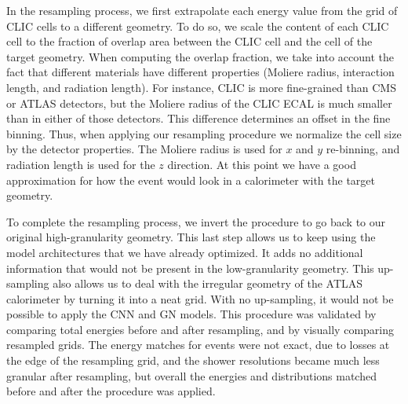 In the resampling process, we first extrapolate each energy value from the grid of CLIC cells to a different geometry. To do so, we scale the content of each CLIC cell to the fraction of overlap area between the CLIC cell and the cell of the target geometry. When computing the overlap fraction, we take into account the fact that different materials have different properties (Moliere radius, interaction length, and radiation length). For instance, CLIC is more fine-grained than CMS or ATLAS detectors, but the Moliere radius of the CLIC ECAL is much smaller than in either of those detectors. This difference determines an offset in the fine binning. Thus, when applying our resampling procedure we normalize the cell size by the detector properties. The Moliere radius is used for $x$ and $y$ re-binning, and radiation length is used for the $z$ direction. At this point we have a good approximation for how the event would look in a calorimeter with the target geometry.

To complete the resampling process, we invert the procedure to go back to our original high-granularity geometry. This last step allows us to keep using the model architectures that we have already optimized. It adds no additional information that would not be present in the low-granularity geometry. This up-sampling also allows us to deal with the irregular geometry of the ATLAS calorimeter by turning it into a neat grid. With no up-sampling, it would not be possible to apply the CNN and GN models. This procedure was validated by comparing total energies before and after resampling, and by visually comparing resampled grids. The energy matches for events were not exact, due to losses at the edge of the resampling grid, and the shower resolutions became much less granular after resampling, but overall the energies and distributions matched before and after the procedure was applied.

